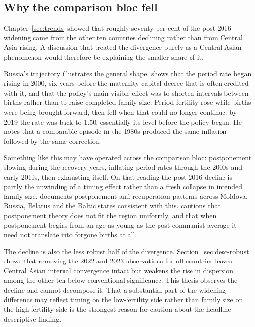 \subsection{Why the comparison bloc fell}
\label{sec:rest-fell}

Chapter~\ref{sec:trends} showed that roughly seventy per cent of the post-2016 widening came from the other ten countries declining rather than from Central Asia rising. A discussion that treated the divergence purely as a Central Asian phenomenon would therefore be explaining the smaller share of it.

Russia's trajectory illustrates the general shape. \textcite{zakharov2024} shows that the period rate began rising in 2000, six years before the maternity-capital decree that is often credited with it, and that the policy's main visible effect was to shorten intervals between births rather than to raise completed family size. Period fertility rose while births were being brought forward, then fell when that could no longer continue: by 2019 the rate was back to 1.50, essentially its level before the policy began. He notes that a comparable episode in the 1980s produced the same inflation followed by the same correction.

Something like this may have operated across the comparison bloc: postponement slowing during the recovery years, inflating period rates through the 2000s and early 2010s, then exhausting itself. On that reading the post-2016 decline is partly the unwinding of a timing effect rather than a fresh collapse in intended family size. \textcite{grigoras2019} documents postponement and recuperation patterns across Moldova, Russia, Belarus and the Baltic states consistent with this. \textcite{billingsley2010} cautions that postponement theory does not fit the region uniformly, and that when postponement begins from an age as young as the post-communist average it need not translate into forgone births at all.

The decline is also the less robust half of the divergence. Section~\ref{sec:desc-robust} shows that removing the 2022 and 2023 observations for all countries leaves Central Asian internal convergence intact but weakens the rise in dispersion among the other ten below conventional significance. This thesis observes the decline and cannot decompose it. That a substantial part of the widening difference may reflect timing on the low-fertility side rather than family size on the high-fertility side is the strongest reason for caution about the headline descriptive finding.

